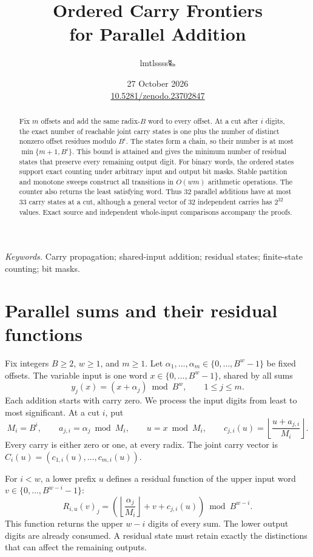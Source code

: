 \documentclass[11pt,a4paper]{article}
\title{\LARGE Ordered Carry Frontiers\\for Parallel Addition}
\author{lmtlssss{\authorsymbol 🜐}}
\date{27 October 2026\\[3pt]\small\href{https://doi.org/10.5281/zenodo.23702847}{10.5281/zenodo.23702847}}
\begin{document}
\maketitle\thispagestyle{plain}
\begin{abstract}
Fix $m$ offsets and add the same radix-$B$ word to every offset.
At a cut after $i$ digits, the exact number of reachable joint carry states is
one plus the number of distinct nonzero offset residues modulo $B^i$.
The states form a chain, so their number is at most
$\min\{m+1,B^i\}$. This bound is attained and gives the minimum number of
residual states that preserve every remaining output digit.
For binary words, the ordered states support exact counting under arbitrary
input and output bit masks. Stable partition and monotone sweeps construct
all transitions in $O(wm)$ arithmetic operations. The counter also returns
the least satisfying word. Thus 32 parallel additions have at most
33 carry states at a cut, although a general vector of 32 independent carries
has $2^{32}$ values. Exact source and independent whole-input comparisons
accompany the proofs.
\end{abstract}
\noindent\textit{Keywords.} Carry propagation; shared-input addition;
residual states; finite-state counting; bit masks.

\section{Parallel sums and their residual functions}
Fix integers $B\geq2$, $w\geq1$, and $m\geq1$.
Let $\alpha_1,\ldots,\alpha_m\in\{0,\ldots,B^w-1\}$ be fixed offsets.
The variable input is one word $x\in\{0,\ldots,B^w-1\}$, shared by all sums
\begin{equation}\label{eq:sums}
 y_j(x)=(x+\alpha_j)\bmod B^w,\qquad 1\leq j\leq m.
\end{equation}
Each addition starts with carry zero. We process the input digits from least
to most significant. At a cut $i$, put
\begin{equation}\label{eq:carry}
 M_i=B^i,\qquad a_{j,i}=\alpha_j\bmod M_i,\qquad
 u=x\bmod M_i,\qquad
 c_{j,i}(u)=\left\lfloor\frac{u+a_{j,i}}{M_i}\right\rfloor.
\end{equation}
Every carry is either zero or one, at every radix.
The joint carry vector is $C_i(u)=(c_{1,i}(u),\ldots,c_{m,i}(u))$.

For $i<w$, a lower prefix $u$ defines a residual function of the upper
input word $v\in\{0,\ldots,B^{w-i}-1\}$:
\begin{equation}\label{eq:residual}
 R_{i,u}(v)_j=
 \left(\left\lfloor\frac{\alpha_j}{M_i}\right\rfloor
       +v+c_{j,i}(u)\right)\bmod B^{w-i}.
\end{equation}
This function returns the upper $w-i$ digits of every sum.
The lower output digits are already consumed. A residual state must retain
exactly the distinctions that can affect the remaining outputs.
\end{document}
